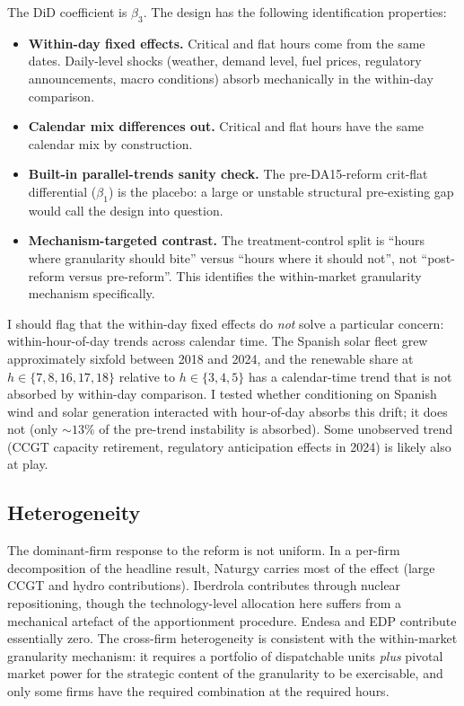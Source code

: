 \documentclass[11pt,a4paper]{article}
\begin{document}
The DiD coefficient is $\beta_3$. The design has the following identification properties:

\begin{itemize}
  \item \textbf{Within-day fixed effects.} Critical and flat hours come from the same dates. Daily-level shocks (weather, demand level, fuel prices, regulatory announcements, macro conditions) absorb mechanically in the within-day comparison.
  \item \textbf{Calendar mix differences out.} Critical and flat hours have the same calendar mix by construction.
  \item \textbf{Built-in parallel-trends sanity check.} The pre-DA15-reform crit-flat differential ($\beta_1$) is the placebo: a large or unstable structural pre-existing gap would call the design into question.
  \item \textbf{Mechanism-targeted contrast.} The treatment-control split is ``hours where granularity should bite'' versus ``hours where it should not'', not ``post-reform versus pre-reform''. This identifies the within-market granularity mechanism specifically.
\end{itemize}

I should flag that the within-day fixed effects do \emph{not} solve a particular concern: within-hour-of-day trends across calendar time. The Spanish solar fleet grew approximately sixfold between 2018 and 2024, and the renewable share at $h \in \{7, 8, 16, 17, 18\}$ relative to $h \in \{3, 4, 5\}$ has a calendar-time trend that is not absorbed by within-day comparison. I tested whether conditioning on Spanish wind and solar generation interacted with hour-of-day absorbs this drift; it does not (only $\sim 13\%$ of the pre-trend instability is absorbed). Some unobserved trend (CCGT capacity retirement, regulatory anticipation effects in 2024) is likely also at play.

\subsection{Heterogeneity}

The dominant-firm response to the reform is not uniform. In a per-firm decomposition of the headline result, Naturgy carries most of the effect (large CCGT and hydro contributions). Iberdrola contributes through nuclear repositioning, though the technology-level allocation here suffers from a mechanical artefact of the apportionment procedure. Endesa and EDP contribute essentially zero. The cross-firm heterogeneity is consistent with the within-market granularity mechanism: it requires a portfolio of dispatchable units \emph{plus} pivotal market power for the strategic content of the granularity to be exercisable, and only some firms have the required combination at the required hours.
\end{document}
